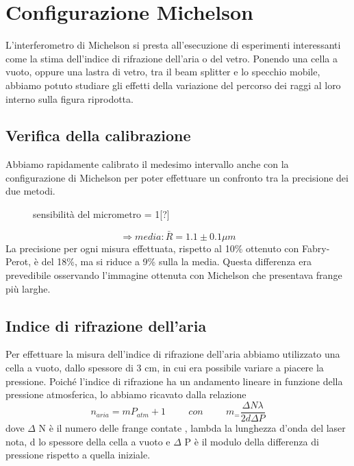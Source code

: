\documentclass{article}
\theoremstyle{definition}
\begin{document}
\section{Configurazione Michelson}
L'interferometro di Michelson si presta all'esecuzione di esperimenti interessanti come la stima dell'indice di rifrazione dell'aria o del vetro. Ponendo una cella a vuoto, oppure una lastra di vetro, tra il beam splitter e lo specchio mobile, abbiamo potuto studiare gli effetti della variazione del percorso dei raggi al loro interno sulla figura riprodotta.

\subsection{Verifica della calibrazione}
Abbiamo rapidamente calibrato il medesimo intervallo anche con la configurazione di Michelson per poter effettuare un confronto tra la precisione dei due metodi.

\begin{figure}[!htbp]
    	\captionsetup{labelformat=empty}
             \caption{sensibilità del micrometro = 1[?]}

    \end{figure}
    
\[\Rightarrow media: \bar{R} =  1.1 \pm 0.1 \mu m\]
La precisione per ogni misura effettuata, rispetto al 10\% ottenuto con Fabry-Perot, è del 18\%, ma si riduce a 9\% sulla la media. Questa differenza era prevedibile osservando l'immagine ottenuta con Michelson che presentava frange più larghe.

\subsection{Indice di rifrazione dell'aria}

Per effettuare la misura dell'indice di rifrazione dell'aria abbiamo utilizzato una cella a vuoto, dallo spessore di 3 cm, in cui era possibile variare a piacere la pressione.
Poiché l'indice di rifrazione ha un andamento lineare in funzione della pressione atmosferica, lo abbiamo ricavato dalla relazione 
\[n_{aria}= m  P_{atm} +1 \hspace{1cm} con \hspace{1cm} m_ = \frac{\Delta N \lambda}{2d \Delta P}\]
dove  $\Delta$ N è il numero delle frange contate , lambda la lunghezza d'onda del laser nota, d lo spessore della cella a vuoto e $\Delta$ P è il modulo della differenza di pressione rispetto a quella iniziale.\\
\end{document}

